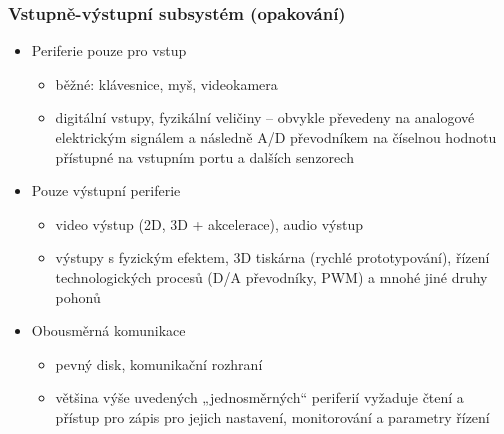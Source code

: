 \documentclass{beamer}
\begin{document}
\begin{frame}
\frametitle{Vstupně-výstupní subsystém (opakování)}

\begin{itemize}
 \item Periferie pouze pro vstup
 \begin{itemize}
  \item  běžné: klávesnice, myš, videokamera
  \item digitální vstupy, fyzikální veličiny -- obvykle převedeny na analogové
elektrickým signálem a následně A/D převodníkem na číselnou hodnotu
přístupné na vstupním portu a dalších senzorech
 \end{itemize}
\end{itemize}
\begin{itemize}
 \item Pouze výstupní periferie
 \begin{itemize}
  \item video výstup (2D, 3D + akcelerace), audio výstup
  \item výstupy s fyzickým efektem, 3D tiskárna (rychlé prototypování),
řízení technologických procesů (D/A převodníky, PWM) a mnohé
jiné druhy pohonů
 \end{itemize}
\end{itemize}
\begin{itemize}
 \item Obousměrná komunikace
 \begin{itemize}
  \item pevný disk, komunikační rozhraní
  \item většina výše uvedených „jednosměrných“ periferií vyžaduje čtení
a přístup pro zápis pro jejich nastavení, monitorování a parametry
řízení
 \end{itemize}
\end{itemize}
\end{frame}
\end{document}
